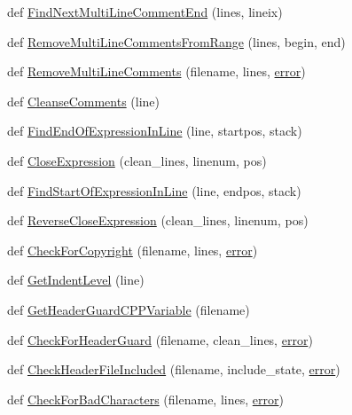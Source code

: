 \begin{DoxyCompactItemize}
\item 
def \hyperlink{namespacecpplint_a4965d6f615333f43155d9e430471e228}{Find\+Next\+Multi\+Line\+Comment\+End} (lines, lineix)
\item 
def \hyperlink{namespacecpplint_a3a5f71cdc2e78491b4bedde8a0103679}{Remove\+Multi\+Line\+Comments\+From\+Range} (lines, begin, end)
\item 
def \hyperlink{namespacecpplint_ac259a6d0f292aeec05dee7ca312e1fc2}{Remove\+Multi\+Line\+Comments} (filename, lines, \hyperlink{_07copy_08_2_read_camera_model_8m_ac546fdc9911f4a876dbfaffbc7426f8b}{error})
\item 
def \hyperlink{namespacecpplint_ad795aa89f263838ec59fb0e7c52c842a}{Cleanse\+Comments} (line)
\item 
def \hyperlink{namespacecpplint_a6e623c46c1ae3bf650454744a693a633}{Find\+End\+Of\+Expression\+In\+Line} (line, startpos, stack)
\item 
def \hyperlink{namespacecpplint_af254258f584f59c87fcfd755e3c9017a}{Close\+Expression} (clean\+\_\+lines, linenum, pos)
\item 
def \hyperlink{namespacecpplint_a8572f47efb3bc11632d1192fd74bb7eb}{Find\+Start\+Of\+Expression\+In\+Line} (line, endpos, stack)
\item 
def \hyperlink{namespacecpplint_a15cd96cbf1c13e655e156fbd98cf0bae}{Reverse\+Close\+Expression} (clean\+\_\+lines, linenum, pos)
\item 
def \hyperlink{namespacecpplint_a0ad6bf921300c829db3696b81fa52d20}{Check\+For\+Copyright} (filename, lines, \hyperlink{_07copy_08_2_read_camera_model_8m_ac546fdc9911f4a876dbfaffbc7426f8b}{error})
\item 
def \hyperlink{namespacecpplint_a1b5cb7c1367845d7c7079eac5ea61dc8}{Get\+Indent\+Level} (line)
\item 
def \hyperlink{namespacecpplint_a3f143d4e8f70c0fd05e3f0ce81b0cc9a}{Get\+Header\+Guard\+C\+P\+P\+Variable} (filename)
\item 
def \hyperlink{namespacecpplint_a3694fa1b195f49a0d78dfc81ee665eec}{Check\+For\+Header\+Guard} (filename, clean\+\_\+lines, \hyperlink{_07copy_08_2_read_camera_model_8m_ac546fdc9911f4a876dbfaffbc7426f8b}{error})
\item 
def \hyperlink{namespacecpplint_ab549dcced7ca1d4b24538ec52b42439e}{Check\+Header\+File\+Included} (filename, include\+\_\+state, \hyperlink{_07copy_08_2_read_camera_model_8m_ac546fdc9911f4a876dbfaffbc7426f8b}{error})
\item 
def \hyperlink{namespacecpplint_a03c0e0d285b02b0e26ec514761654da8}{Check\+For\+Bad\+Characters} (filename, lines, \hyperlink{_07copy_08_2_read_camera_model_8m_ac546fdc9911f4a876dbfaffbc7426f8b}{error})

\end{DoxyCompactItemize}
